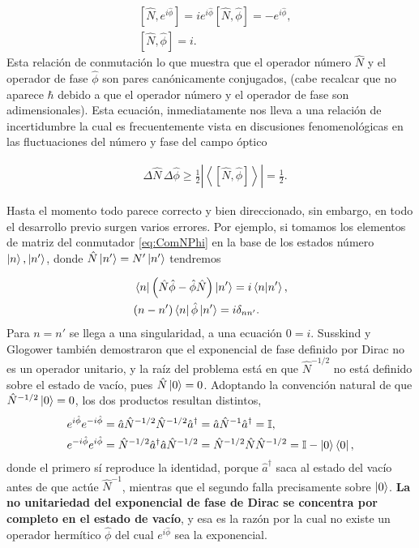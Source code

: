         \begin{align}\label{eq:ComNPhi}
            & \left[ \hat{N}, e^{i\hat{\phi}} \right] = ie^{i\hat{\phi}}\left[\hat{N},\hat{\phi} \right] = -e^{i\hat{\phi}},\\
            & \left[\hat{N}, \hat{\phi}\right] = i.
        \end{align}
        Esta relación de conmutación lo que muestra que el operador número $\hat{N}$ y el operador de fase $\hat{\phi}$ son pares canónicamente  conjugados, (cabe recalcar que no aparece $\hbar$ debido a que el operador número y el operador de fase son adimensionales). Esta ecuación, inmediatamente nos lleva a una relación de incertidumbre la cual es frecuentemente vista en discusiones fenomenológicas en las fluctuaciones del número y fase del campo óptico

        \begin{align}
            & \Delta \hat{N}\, \Delta \hat{\phi} \geq \frac{1}{2}\left| \left\langle [\hat{N},\hat{\phi}]\right\rangle \right| = \frac{1}{2}.
        \end{align}

        Hasta el momento todo parece correcto y bien direccionado, sin embargo, en todo el desarrollo previo surgen varios errores. Por ejemplo, si tomamos los elementos de matriz del conmutador \ref{eq:ComNPhi} en la base de los estados número $\ket{n},\ket{n'}$, donde $\hat{N}\ket{n'}=N'\ket{n'}$ tendremos

        \begin{align}
            & \bra{n}\left( \hat{N}\hat{\phi} - \hat{\phi}\hat{N} \right) \ket{n'} = i \braket{n|n'} ,\\
            & (n-n')\bra{n}\hat{\phi}\ket{n'} = i \delta_{nn'}.
        \end{align}
        Para $n=n'$ se llega a una singularidad, a una ecuación $0=i$. Susskind y Glogower también demostraron que el exponencial de fase definido por Dirac no es un operador unitario, y la raíz del problema está en que $\hat{N}^{-1/2}$ no está definido sobre el estado de vacío, pues $\hat{N}\ket{0} = 0$. Adoptando la convención natural de que $\hat{N}^{-1/2}\ket{0}=0$, los dos productos resultan distintos,
        \begin{align}
            & e^{i\hat{\phi}}e^{-i\hat{\phi}} = \hat{a}\hat{N}^{-1/2} \hat{N}^{-1/2}\hat{a}^\dagger = \hat{a}\hat{N}^{-1}\hat{a}^\dagger = \mathbb{I},\\
            & e^{-i\hat{\phi}}e^{i\hat{\phi}} = \hat{N}^{-1/2}\hat{a}^\dagger\hat{a}\hat{N}^{-1/2} = \hat{N}^{-1/2}\hat{N}\hat{N}^{-1/2}= \mathbb{I} - \ket{0}\bra{0},
        \end{align}
        donde el primero sí reproduce la identidad, porque $\hat{a}^{\dagger}$ saca al estado del vacío antes de que actúe $\hat{N}^{-1}$, mientras que el segundo falla precisamente sobre $\ket{0}$. \textbf{La no unitariedad del exponencial de fase de Dirac se concentra por completo en el estado de vacío}, y esa es la razón por la cual no existe un operador hermítico $\hat{\phi}$ del cual $e^{i\hat{\phi}}$ sea la exponencial.

